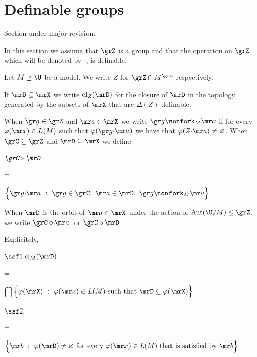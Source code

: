 \section{Definable groups}\label{definablegroups}

\def\medrel#1{\parbox[t]{5ex}{$\displaystyle\hfil #1$}}
\def\ceq#1#2#3{\parbox[t]{16ex}{$\displaystyle #1$}\medrel{#2}{$\displaystyle #3$}}

\noindent\llap{\textcolor{red}{\Large\warning}\kern1.5ex}\ignorespaces
Section under major revision.


In this section we assume that $\grZ$ is a group and that the operation on $\grZ$, which will be denoted by $\cdot$, is definable.



Let $M\preceq\U$ be a model.
We write $Z$ for 
$\grZ\cap M^{\gr z}$ respectively.

If $\mrD\subseteq\mrX$ we write \emph{${\rm cl}_Z(\mrD)$\/} for the closure of $\mrD$ in the topology generated by the subsets of $\mrX$ that are $\Delta(Z)$-definable.

When ${\gr g}\in\grZ$ and ${\mr a}\in\mrX$ we write ${\gr g}\nonfork_M{\mr a}$ if for every $\varphi({\mr x})\in L(M)$ such that $\varphi({\gr g}{\cdot}{\mr a})$ we have that $\varphi(Z{\cdot}{\mr a})\neq\varnothing$.
When $\grC\subseteq\grZ$ and $\mrD\subseteq\mrX$ we define

\ceq{\hfill\emph{$\grC\diamond\mrD$}}{=}{\Big\{{\gr g}{\cdot}{\mr a}\ :\ {\gr g}\in\grC,\ {\mr a}\in\mrD,\ {\gr g}\nonfork_M {\mr a}\Big\}}

When $\mrD$ is the orbit of ${\mr a}\in\mrX$ under the action of ${\rm Aut}(\U/M)\le\grZ$, we write $\grC\diamond {\mr a}$ for $\grC\diamond\mrD$.

Explicitely,

\ceq{\ssf1.\hfill{\rm cl}_M(\mrD)}{=}{\bigcap\Big\{\varphi(\mrX)\ :\ \varphi({\mr x})\in L(M)\text{ such that }\mrD\subseteq\varphi(\mrX)\Big\}}

\ceq{\ssf2.}{=}{\Big\{{\mr b}\ :\ \varphi(\mrD)\neq\varnothing\text{ for every }\varphi({\mr x})\in L(M)\text{ that is satisfied by }{\mr b}\Big\}}


